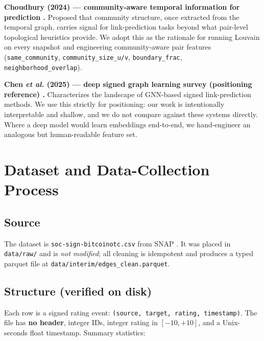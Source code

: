 \documentclass[11pt,a4paper]{article}
\newcommand{\code}[1]{\texttt{#1}}
\begin{document}
\textbf{Choudhury (2024) --- community-aware temporal information for
prediction \citep{choudhury2024}.} Proposed that community structure, once
extracted from the temporal graph, carries signal for link-prediction tasks
beyond what pair-level topological heuristics provide. We adopt this as the
rationale for running Louvain on every snapshot and engineering
community-aware pair features (\code{same\_community},
\code{community\_size\_u/v}, \code{boundary\_frac},
\code{neighborhood\_overlap}).

\textbf{Chen \textit{et al.} (2025) --- deep signed graph learning survey
(positioning reference) \citep{chen2025}.} Characterizes the landscape of
GNN-based signed link-prediction methods. We use this strictly for
positioning: our work is intentionally interpretable and shallow, and we do
not compare against these systems directly. Where a deep model would learn
embeddings end-to-end, we hand-engineer an analogous but human-readable
feature set.

\section{Dataset and Data-Collection Process}

\subsection{Source}
The dataset is \code{soc-sign-bitcoinotc.csv} from SNAP \citep{kumar2016}. It
was placed in \code{data/raw/} and is \emph{not modified}; all cleaning is
idempotent and produces a typed parquet file at
\code{data/interim/edges\_clean.parquet}.

\subsection{Structure (verified on disk)}
Each row is a signed rating event: \code{(source, target, rating, timestamp)}.
The file has \textbf{no header}, integer IDs, integer rating in
$[-10,+10]$, and a Unix-seconds float timestamp. Summary statistics:
\end{document}
